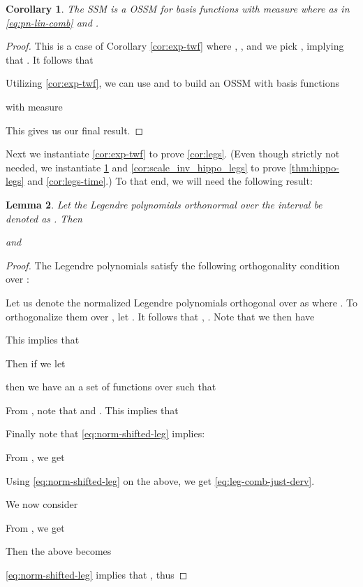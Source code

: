 \documentclass{article}
\newtheorem{lemma}{Lemma}[section]
\newtheorem{corollary}[lemma]{Corollary}
\begin{document}
\begin{corollary}The SSM  is a OSSM for basis functions  with measure  where
    as in \eqref{eq:pn-lin-comb}
 and .
 \label{cor:time_inv_hippo_legs}
\end{corollary}
\begin{proof}
This is a case of Corollary \ref{cor:exp-twf} where , , and we pick , implying that . It follows that


Utilizing \cref{cor:exp-twf}, we can use  and  to build an OSSM with basis functions


with measure



 This gives us our final result.
\end{proof}





Next we instantiate \cref{cor:exp-twf} to prove \cref{cor:legs}. (Even though strictly not needed, we instantiate \cref{cor:time_inv_hippo_legs} and \cref{cor:scale_inv_hippo_legs} to prove \cref{thm:hippo-legs} and \cref{cor:legs-time}.) To that end, we will need the following result:

\begin{lemma}
Let the Legendre polynomials orthonormal over the interval  be denoted as . Then





and

   
\end{lemma}

\begin{proof}
The Legendre polynomials satisfy the following orthogonality condition over :

Let us denote the normalized Legendre polynomials orthogonal over  as  where . To orthogonalize them over , let .  It follows that , . Note that we then have



This implies that



Then if we let


then we have an a set of functions over  such that



From \cite[(2.8), (2.9)]{chihara}, note that  and  . This implies that



Finally note that \eqref{eq:norm-shifted-leg} implies:



From \cite[7]{gu2020hippo}, we get


Using \eqref{eq:norm-shifted-leg} on the above, we get \eqref{eq:leg-comb-just-derv}.

We now consider



From \cite[8]{gu2020hippo}, we get



 Then the above becomes
 

\eqref{eq:norm-shifted-leg} implies that , thus



\end{proof}
\end{document}
